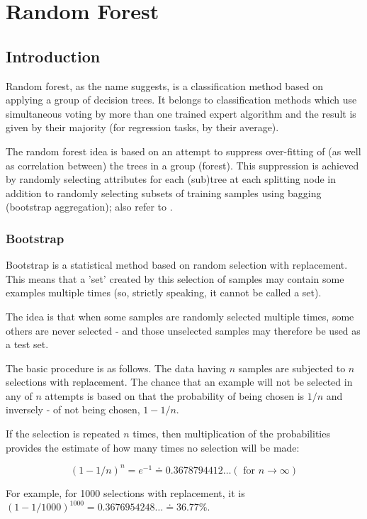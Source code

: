 \chapter{Random Forest}
\section{Introduction}
Random forest, as the name suggests, is a classification method based on applying a group of decision trees. It belongs to classification methods which use simultaneous voting by more than one trained expert algorithm and the result is given by their majority (for regression tasks, by their average).

The random forest idea is based on an attempt to suppress over-fitting of (as well as correlation between) the trees in a group (forest). This suppression is achieved by randomly selecting attributes for each (sub)tree at each splitting node in addition to randomly selecting subsets of training samples using bagging (bootstrap aggregation); also refer to \cite{ref32,ref72}.

\subsection{Bootstrap}
Bootstrap is a statistical method based on random selection with replacement. This means that a 'set' created by this selection of samples may contain some examples multiple times (so, strictly speaking, it cannot be called a set).

The idea is that when some samples are randomly selected multiple times, some others are never selected - and those unselected samples may therefore be used as a test set.

The basic procedure is as follows. The data having $n$ samples are subjected to $n$ selections with replacement. The chance that an example will not be selected in any of $n$ attempts is based on that the probability of being chosen is $1 / n$ and inversely - of not being chosen, $1-1 / n$.

If the selection is repeated $n$ times, then multiplication of the probabilities provides the estimate of how many times no selection will be made:


\begin{equation*}
(1-1 / n)^{n}=e^{-1} \doteq 0.3678794412 \ldots(\text { for } n \rightarrow \infty) \tag{8.1}
\end{equation*}


For example, for 1000 selections with replacement, it is $(1-1 / 1000)^{1000}= 0.3676954248 \ldots \doteq 36.77 \%$.

